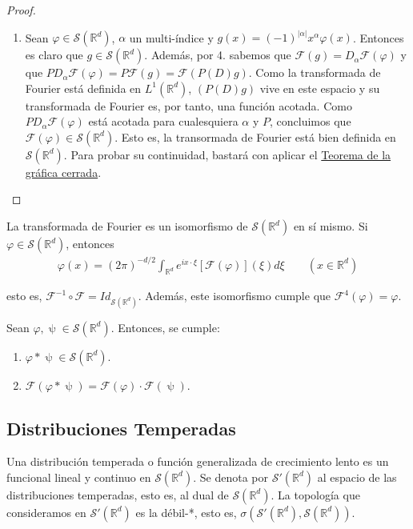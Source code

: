 \begin{proof}
\begin{enumerate}
\item Sean $\varphi\in\mathcal{S}(\mathds{R}^d)$, $\alpha$ un multi-índice y $g(x) = (-1)^{\vert\alpha\vert}x^{\alpha}\varphi(x)$. Entonces es claro que $g\in\mathcal{S}(\mathds{R}^{d})$. Además, por 4. sabemos que $\mathcal{F}(g) = D_{\alpha}\mathcal{F}(\varphi)$ y que $PD_{\alpha} \mathcal{F} (\varphi) = P\mathcal{F} (g) = \mathcal{F} (P(D)g)$. Como la transformada de Fourier está definida en $L^1(\mathds{R}^d)$, $(P(D)g)$ vive en este espacio y su transformada de Fourier es, por tanto, una función acotada.  Como $PD_{\alpha}\mathcal{F}(\varphi)$ está acotada para cualesquiera $\alpha$ y $P$, concluimos que $\mathcal{F}(\varphi)\in\mathcal{S}(\mathds{R}^{d})$. Esto es, la transormada de Fourier está bien definida en $\mathcal{S}(\mathds{R}^{d})$. Para probar su continuidad, bastará con aplicar el \hyperref[thm:h06]{Teorema de la gráfica cerrada}. 
\end{enumerate}
\end{proof}

\begin{teorema}\label{thm:d07}
La transformada de Fourier es un isomorfismo de $\mathcal{S}(\mathds{R}^{d})$ en sí mismo. Si $\varphi\in \mathcal{S}(\mathds{R}^{d})$, entonces 
\begin{gather}
\varphi(x) = (2\pi)^{-d/2}\int_{\mathds{R}^{d}} e^{ix\cdot\xi}[\mathcal{F}(\varphi)](\xi)d\xi \qquad (x\in \mathds{R}^{d})
\end{gather}

esto es, $\mathcal{F}^{-1}\circ \mathcal{F} = Id_{\mathcal{S}(\mathds{R}^{d})}$. Además, este isomorfismo cumple que $\mathcal{F}^{4}(\varphi) = \varphi$.
\end{teorema}

\begin{teorema}
    Sean $\varphi,\uppsi\in \mathcal{S}(\mathds{R}^{d})$. Entonces, se cumple:
    \begin{enumerate}
    \item $\varphi * \uppsi \in \mathcal{S}(\mathds{R}^{d})$.
        \item $\mathcal{F}(\varphi * \uppsi) = \mathcal{F}(\varphi) \cdot \mathcal{F}(\uppsi)$.
    \end{enumerate}

\end{teorema}

\subsection{Distribuciones Temperadas}
\begin{definicion}
Una distribución temperada o función generalizada de crecimiento lento es un funcional lineal y continuo en $\mathcal{S}(\mathds{R}^{d})$. Se denota por $\mathcal{S'}(\mathds{R}^{d})$ al espacio de las distribuciones temperadas, esto es, al dual de $\mathcal{S}(\mathds{R}^{d})$. La topología que consideramos en $\mathcal{S'}(\mathds{R}^{d})$                   es la débil-*, esto es, $\sigma(\mathcal{S'}(\mathds{R}^{d}),\mathcal{S}(\mathds{R}^{d}))$.
\end{definicion}


